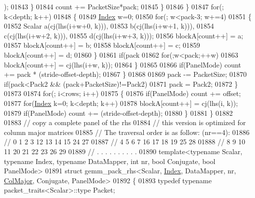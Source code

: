 \begin{DoxyCode}
      );
01843           \}
01844           count += PacketSize*pack;
01845         \}
01846       \}
01847       \textcolor{keywordflow}{for}(; k<depth; k++)
01848       \{
01849         \hyperlink{namespace_eigen_a62e77e0933482dafde8fe197d9a2cfde}{Index} w=0;
01850         \textcolor{keywordflow}{for}(; w<pack-3; w+=4)
01851         \{
01852           Scalar a(cj(lhs(i+w+0, k))),
01853                  b(cj(lhs(i+w+1, k))),
01854                  c(cj(lhs(i+w+2, k))),
01855                  d(cj(lhs(i+w+3, k)));
01856           blockA[count++] = a;
01857           blockA[count++] = b;
01858           blockA[count++] = c;
01859           blockA[count++] = d;
01860         \}
01861         \textcolor{keywordflow}{if}(pack%
01862           \textcolor{keywordflow}{for}(;w<pack;++w)
01863             blockA[count++] = cj(lhs(i+w, k));
01864       \}
01865 
01866       \textcolor{keywordflow}{if}(PanelMode) count += pack * (stride-offset-depth);
01867     \}
01868 
01869     pack -= PacketSize;
01870     \textcolor{keywordflow}{if}(pack<Pack2 && (pack+PacketSize)!=Pack2)
01871       pack = Pack2;
01872   \}
01873 
01874   \textcolor{keywordflow}{for}(; i<rows; i++)
01875   \{
01876     \textcolor{keywordflow}{if}(PanelMode) count += offset;
01877     \textcolor{keywordflow}{for}(\hyperlink{namespace_eigen_a62e77e0933482dafde8fe197d9a2cfde}{Index} k=0; k<depth; k++)
01878       blockA[count++] = cj(lhs(i, k));
01879     \textcolor{keywordflow}{if}(PanelMode) count += (stride-offset-depth);
01880   \}
01881 \}
01882 
01883 \textcolor{comment}{// copy a complete panel of the rhs}
01884 \textcolor{comment}{// this version is optimized for column major matrices}
01885 \textcolor{comment}{// The traversal order is as follow: (nr==4):}
01886 \textcolor{comment}{//  0  1  2  3   12 13 14 15   24 27}
01887 \textcolor{comment}{//  4  5  6  7   16 17 18 19   25 28}
01888 \textcolor{comment}{//  8  9 10 11   20 21 22 23   26 29}
01889 \textcolor{comment}{//  .  .  .  .    .  .  .  .    .  .}
01890 \textcolor{keyword}{template}<\textcolor{keyword}{typename} Scalar, \textcolor{keyword}{typename} Index, \textcolor{keyword}{typename} DataMapper, \textcolor{keywordtype}{int} nr, \textcolor{keywordtype}{bool} Conjugate, \textcolor{keywordtype}{bool} PanelMode>
01891 \textcolor{keyword}{struct }gemm\_pack\_rhs<Scalar, \hyperlink{namespace_eigen_a62e77e0933482dafde8fe197d9a2cfde}{Index}, DataMapper, nr, \hyperlink{group__enums_ggaacded1a18ae58b0f554751f6cdf9eb13a0cbd4bdd0abcfc0224c5fcb5e4f6669a}{ColMajor}, Conjugate, PanelMode>
01892 \{
01893   \textcolor{keyword}{typedef} \textcolor{keyword}{typename} packet\_traits<Scalar>::type Packet;

\end{DoxyCode}
